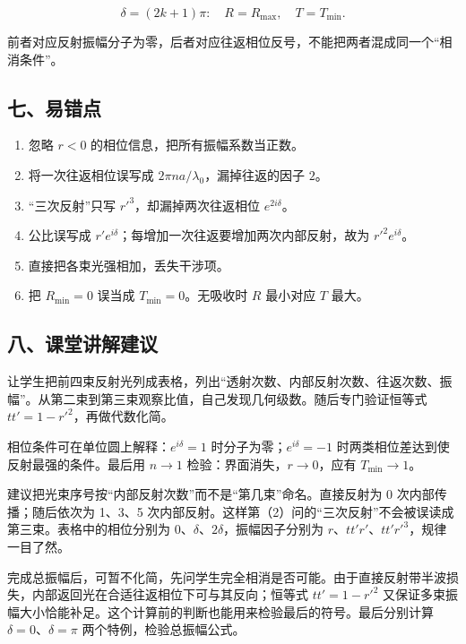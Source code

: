 \documentclass[12pt,a4paper,UTF8]{ctexart}
\newcommand{\tightlist}{\setlength{\itemsep}{0pt}\setlength{\parskip}{0pt}}
\begin{document}
\[\delta=(2k+1)\pi:\quad R=R_{\max},\quad T=T_{\min}.\]

前者对应反射振幅分子为零，后者对应往返相位反号，不能把两者混成同一个``相消条件''。

\subsection{七、易错点}\label{ux4e03ux6613ux9519ux70b9-6}

\begin{enumerate}
\def\labelenumi{\arabic{enumi}.}
\tightlist
\item
  忽略 \(r<0\) 的相位信息，把所有振幅系数当正数。
\item
  将一次往返相位误写成 \(2\pi na/\lambda_0\)，漏掉往返的因子 \(2\)。
\item
  ``三次反射''只写 \(r'^3\)，却漏掉两次往返相位 \(e^{2i\delta}\)。
\item
  公比误写成 \(r'e^{i\delta}\)；每增加一次往返要增加两次内部反射，故为
  \(r'^2e^{i\delta}\)。
\item
  直接把各束光强相加，丢失干涉项。
\item
  把 \(R_{\min}=0\) 误当成 \(T_{\min}=0\)。无吸收时 \(R\) 最小对应 \(T\)
  最大。
\end{enumerate}

\subsection{八、课堂讲解建议}\label{ux516bux8bfeux5802ux8bb2ux89e3ux5efaux8bae-6}

让学生把前四束反射光列成表格，列出``透射次数、内部反射次数、往返次数、振幅''。从第二束到第三束观察比值，自己发现几何级数。随后专门验证恒等式
\(tt'=1-r'^2\)，再做代数化简。

相位条件可在单位圆上解释：\(e^{i\delta}=1\)
时分子为零；\(e^{i\delta}=-1\) 时两类相位差达到使反射最强的条件。最后用
\(n\to1\) 检验：界面消失，\(r\to0\)，应有 \(T_{\min}\to1\)。

建议把光束序号按``内部反射次数''而不是``第几束''命名。直接反射为 0
次内部传播；随后依次为 1、3、5
次内部反射。这样第（2）问的``三次反射''不会被误读成第三束。表格中的相位分别为
\(0\)、\(\delta\)、\(2\delta\)，振幅因子分别为
\(r\)、\(tt'r'\)、\(tt'r'^3\)，规律一目了然。

完成总振幅后，可暂不化简，先问学生完全相消是否可能。由于直接反射带半波损失，内部返回光在合适往返相位下可与其反向；恒等式
\(tt'=1-r'^2\)
又保证多束振幅大小恰能补足。这个计算前的判断也能用来检验最后的符号。最后分别计算
\(\delta=0\)、\(\delta=\pi\) 两个特例，检验总振幅公式。
\end{document}
